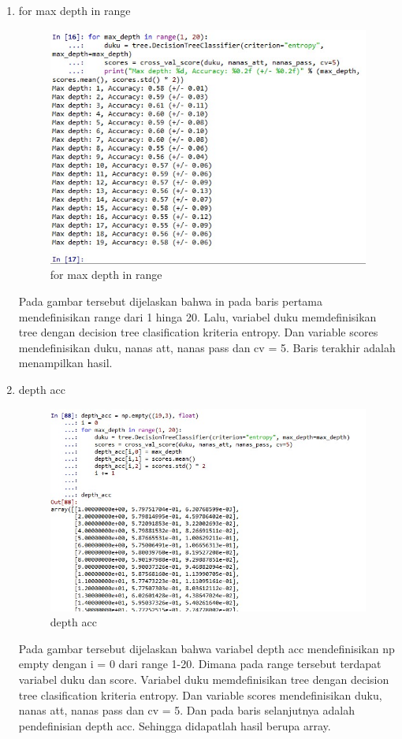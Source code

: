 \begin{enumerate}
\item for max depth in range 
\begin{figure}
\centering
\includegraphics[scale=0.5]{figures/g10.jpg}
\caption{for max depth in range}
\label{contoh}
\end{figure}
\par Pada gambar tersebut dijelaskan bahwa in pada baris pertama mendefinisikan range dari 1 hinga 20. Lalu, variabel duku memdefinisikan tree dengan decision tree clasification kriteria entropy. Dan variable scores mendefinisikan duku, nanas att, nanas pass dan cv = 5. Baris terakhir adalah menampilkan hasil.

\item depth acc
\begin{figure}
\centering
\includegraphics[scale=0.5]{figures/g11.jpg}
\caption{depth acc}
\label{contoh}
\end{figure}
\par Pada gambar tersebut dijelaskan bahwa variabel depth acc mendefinisikan np empty dengan i = 0 dari range 1-20. Dimana pada range tersebut terdapat variabel duku dan score. Variabel duku memdefinisikan tree dengan decision tree clasification kriteria entropy. Dan variable scores mendefinisikan duku, nanas att, nanas pass dan cv = 5. Dan pada baris selanjutnya adalah pendefinisian depth acc. Sehingga didapatlah hasil berupa array.


\end{enumerate}
